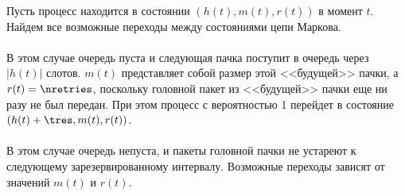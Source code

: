 Пусть процесс находится в состоянии $(h(t),m(t),r(t))$ в момент $t$. Найдем все возможные переходы между состояниями цепи Маркова. 

\noindent\paragraph{} В этом случае очередь пуста и следующая пачка поступит в очередь через $|h(t)|$ слотов. $m(t)$ представляет собой размер этой <<будущей>> пачки, а $r(t) = \nretries$, поскольку головной пакет из <<будущей>> пачки еще ни разу не был передан.
При этом процесс с вероятностью 1 перейдет в состояние $(h(t)+\tres,m(t),r(t))$.
\noindent\paragraph{} В этом случае очередь непуста, и пакеты головной пачки не устареют к следующему зарезервированному интервалу. Возможные переходы зависят от значений $m(t)$ и $r(t)$.
